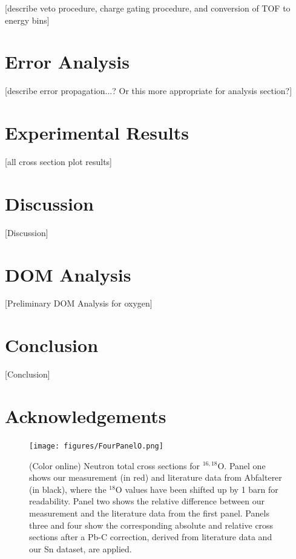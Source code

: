 \documentclass[twocolumn,secnumarabic,amssymb, nobibnotes, aps, prl,
superscriptaddress, nobalancelastpage]{revtex4}
\begin{document}
[describe veto procedure, charge gating procedure, and conversion of TOF to
energy bins]

\section{Error Analysis}

[describe error propagation...? Or this more appropriate for analysis section?]

\section{Experimental Results}

[all cross section plot results]

\section{Discussion}

[Discussion]

\section{DOM Analysis}

[Preliminary DOM Analysis for oxygen]

\section{Conclusion}

[Conclusion]

\section{Acknowledgements}

\begin{figure}
    \texttt{[image: figures/FourPanelO.png]}
    \caption{(Color online) Neutron total cross sections for $^{16,18}$O.
     Panel one shows our measurement (in red) and literature data from
     Abfalterer (in
     black), where the $^{18}$O values have been shifted up by 1 barn for
     readability. Panel two shows the relative difference between our 
     measurement and the literature data from the first panel. Panels three and
     four show the corresponding absolute and relative cross sections after a
     Pb-C correction, derived from literature data and our Sn dataset,
     are applied.
    }
\end{figure}
\end{document}
